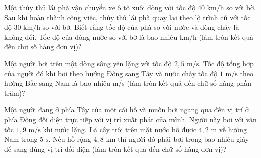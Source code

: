 \begin{ex}
Một thủy thủ lái phà vận chuyển xe ô tô xuôi dòng với tốc độ $40\text{ km/h}$ so với bờ. Sau khi hoàn thành công việc, thủy thủ lái phà quay lại theo lộ trình cũ với tốc độ $30\text{ km/h}$ so với bờ. Biết rằng tốc độ của phà so với nước và dòng chảy là không đổi. Tốc độ của dòng nước so với bờ là bao nhiêu km/h (làm tròn kết quả đến chữ số hàng đơn vị)?

\end{ex}

\begin{ex}
Một người bơi trên một dòng sông yên lặng với tốc độ $2{,}5\text{ m/s}$. Tốc độ tổng hợp của người đó khi bơi theo hướng Đông sang Tây và nước chảy tốc độ $1\text{ m/s}$ theo hướng Bắc sang Nam là bao nhiêu m/s (làm tròn kết quả đến chữ số hàng phần trăm)?

\end{ex}

\begin{ex}
Một người đang ở phía Tây của một cái hồ và muốn bơi ngang qua đến vị trí ở phía Đông đối diện trực tiếp với vị trí xuất phát của mình. Người này bơi với vận tốc $1{,}9\text{ m/s}$ khi nước lặng. Lá cây trôi trên mặt nước hồ được $4{,}2\text{ m}$ về hướng Nam trong $5\text{ s}$. Nếu hồ rộng $4{,}8\text{ km}$ thì người đó phải bơi trong bao nhiêu giây để sang đúng vị trí đối diện (làm tròn kết quả đến chữ số hàng đơn vị)?

\end{ex}

